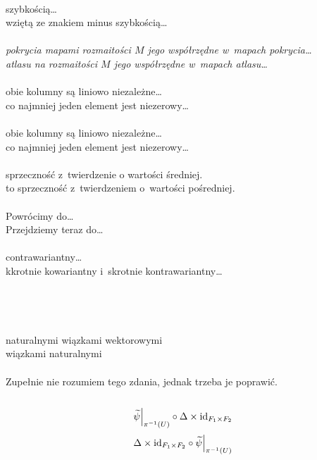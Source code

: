 \documentclass[a4paper,11pt]{article}
\begin{document}
 \\
\Jest szybkością\ldots \\
\Pow  wziętą ze znakiem minus szybkością\ldots \\
 \\
\Jest \emph{pokrycia mapami rozmaitości $M$ jego współrzędne
  w~mapach pokrycia\ldots} \\
\Pow \emph{atlasu na rozmaitości $M$ jego współrzędne
  w~mapach atlasu\ldots} \\
 \\
\Jest obie kolumny są liniowo niezależne\ldots \\
\Pow  co najmniej jeden element jest niezerowy\ldots \\
 \\
\Jest obie kolumny są liniowo niezależne\ldots \\
\Pow  co najmniej jeden element jest niezerowy\ldots \\
 \\
\Jest sprzeczność z~twierdzenie o wartości średniej.\\
\Pow  to sprzeczność z~twierdzeniem o~wartości pośredniej.\\
 \\
\Jest Powrócimy do\ldots\\
\Pow  Przejdziemy teraz do\ldots\\
 \\
\Jest contrawariantny\ldots\\
\Pow  k\dywiz krotnie kowariantny i~s\dywiz krotnie kontrawariantny\ldots \\
 \\
\Jest \\
\Pow \\
 \\
\Jest naturalnymi wiązkami wektorowymi\ld \\
\Pow  wiązkami naturalnymi\ld \\
 \\
Zupełnie nie rozumiem tego zdania, jednak trzeba je poprawić. \\
 \\
\Jest
\begin{equation*}
  \widetilde{ \psi }\Big|_{ \pi^{ -1 }( U ) } \circ \Delta \times \mathrm{id}_{ F_{ 1 } \times F_{ 2 } }
\end{equation*}
\Pow
\begin{equation*}
  \Delta \times \mathrm{id}_{ F_{ 1 } \times F_{ 2 } } \circ \widetilde{ \psi }\Big|_{ \pi^{ -1 }( U ) }
\end{equation*}
\end{document}
